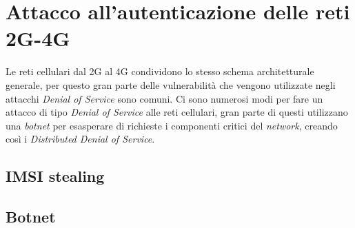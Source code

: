 \section{Attacco all'autenticazione delle reti 2G-4G}
Le reti cellulari dal 2G al 4G condividono lo stesso schema architetturale generale, per questo gran parte delle vulnerabilità che vengono
utilizzate negli attacchi \textit{Denial of Service} sono comuni.
Ci sono numerosi modi per fare un attacco di tipo \textit{Denial of Service} alle reti cellulari, gran parte di questi utilizzano
una \textit{botnet} per esasperare di richieste i componenti critici del \textit{network}, creando così i \textit{Distributed Denial of Service}.\\


\subsection{IMSI stealing}
\cite{dos-imsi}
\cite{imsi-catcher}

\subsection{Botnet}
\cite{measuring-dos}

